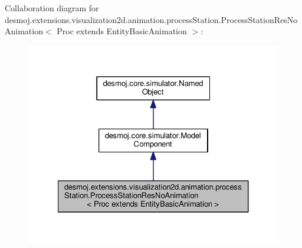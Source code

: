 Collaboration diagram for desmoj.\-extensions.\-visualization2d.\-animation.\-process\-Station.\-Process\-Station\-Res\-No\-Animation$<$ Proc extends Entity\-Basic\-Animation $>$\-:
\nopagebreak
\begin{figure}[H]
\begin{center}
\leavevmode
\includegraphics[width=326pt]{classdesmoj_1_1extensions_1_1visualization2d_1_1animation_1_1process_station_1_1_process_station686ecbdd2ec114277f66cb4cbe661d70}
\end{center}
\end{figure}
